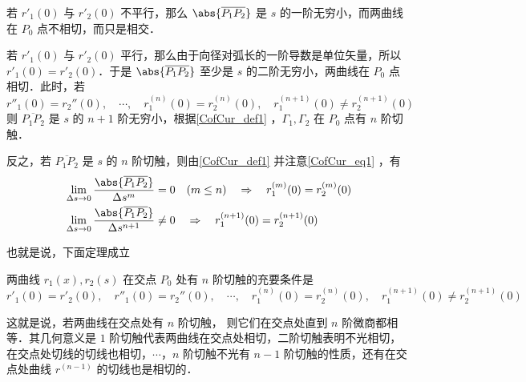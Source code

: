 若 $r'_1(0)$ 与 $r'_2(0)$ 不平行，那么 $\abs{\overline{P_1P_2}}$ 是 $s$ 的一阶无穷小，而两曲线在 $P_0$ 点不相切，而只是相交．

若 $r'_1(0)$ 与 $r'_2(0)$ 平行，那么由于向径对弧长的一阶导数是单位矢量，所以 $r'_1(0)=r'_2(0)$．于是 $\abs{\overline{P_1P_2}}$ 至少是 $s$ 的二阶无穷小，两曲线在 $P_0$ 点相切．此时，若
\begin{equation}
r''_1(0)=r_2''(0),\quad\cdots,\quad r^{(n)}_1(0)=r^{(n)}_2(0),\quad r^{(n+1)}_1(0)\neq r^{(n+1)}_2(0)
\end{equation}
则 $\overline{P_1P_2}$ 是 $s$ 的 $n+1$ 阶无穷小，根据\autoref{CofCur_def1} ，$\Gamma_1,\Gamma_2$ 在 $P_0$ 点有 $n$ 阶切触．

反之，若 $\overline{P_1P_2}$ 是 $s$ 的 $n$ 阶切触，则由\autoref{CofCur_def1} 并注意\autoref{CofCur_eq1} ，有
\begin{equation}
\begin{aligned}
&\lim_{\Delta s\rightarrow0}\frac{\abs{\overline{P_1P_2}}}{\Delta s^{m}}=0\quad(m\leq n)\quad\Rightarrow \quad r^{(m)}_1(0)=r^{(m)}_2(0)\\
&\lim_{\Delta s\rightarrow0}\frac{\abs{\overline{P_1P_2}}}{\Delta s^{n+1}}\neq0\quad\Rightarrow\quad r^{(n+1)}_1(0)=r^{(n+1)}_2(0)
\end{aligned}
\end{equation}

也就是说，下面定理成立
\begin{theorem}{}
两曲线 $r_1(x),r_2(s)$ 在交点 $P_0$ 处有 $n$ 阶切触的充要条件是
\begin{equation}
r'_1(0)=r'_2(0),\quad r''_1(0)=r_2''(0),\quad\cdots,\quad r^{(n)}_1(0)=r^{(n)}_2(0),\quad r^{(n+1)}_1(0)\neq r^{(n+1)}_2(0)
\end{equation}
\end{theorem}
这就是说，若两曲线在交点处有 $n$ 阶切触， 则它们在交点处直到 $n$ 阶微商都相等．其几何意义是 $1$ 阶切触代表两曲线在交点处相切，二阶切触表明不光相切，在交点处切线的切线也相切，$\cdots$，$n$ 阶切触不光有 $n-1$ 阶切触的性质，还有在交点处曲线 $r^{(n-1)}$ 的切线也是相切的．   
